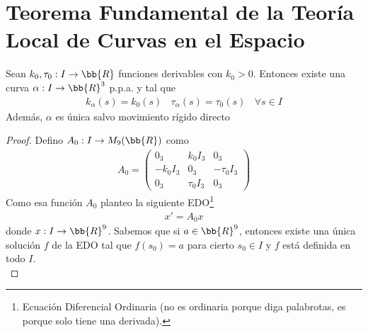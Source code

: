 \section{Teorema Fundamental de la Teoría Local de Curvas en el Espacio}
\begin{teo}
    Sean $k_0, \tau_0:I\to \bb{R}$ funciones derivables con $k_0>0$. Entonces existe una curva $\alpha:I\to \bb{R}^3$ p.p.a. y tal que 
    \begin{gather*}
        k_\alpha(s) = k_0(s)\ \ \ \ \tau_\alpha(s)=\tau_0(s)\ \ \ \ \forall s \in I
    \end{gather*}
    Además, $\alpha$ es única salvo movimiento rígido directo
    \begin{proof}
        Defino $A_0:I\to M_9(\bb{R})$ como 
        \begin{gather*}
            A_0 = \left(\begin{array}{c|c|c}
                0_3 & k_0I_3 & 0_3\\
                \hline
                -k_0I_3 & 0_3 & -\tau_0I_3\\
                \hline
                0_3 & \tau_0I_3 & 0_3
            \end{array}\right)
        \end{gather*}
        Como esa función $A_0$ planteo la siguiente EDO\footnote{Ecuación Diferencial Ordinaria (no es ordinaria porque diga palabrotas, es porque solo tiene una derivada).}
        \begin{gather*}
            x'=A_0x
        \end{gather*}
        donde $x:I\to \bb{R}^9$. Sabemos que si $a\in \bb{R}^9$, entonces existe una única solución $f$ de la EDO tal que $f(s_0)=a$ para cierto $s_0\in I$ y $f$ está definida en todo $I$. \\


\end{proof}
\end{teo}
